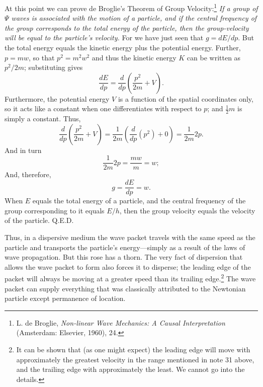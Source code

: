 At this point we can prove de Broglie's Theorem of Group
Velocity:\footnote{L. de Broglie, \emph{Non-linear Wave Mechanics: A
  Causal Interpretation} (Amsterdam: Elsevier, 1960), 24.}
\emph{If a group of $\Psi$ waves is associated with the motion of a particle,
and if the central frequency of the group corresponds to the total
energy of the particle, then the group-velocity will be equal to the
particle's velocity.} For we have just seen that $g = dE/dp$. But the total 
energy equals the kinetic energy plus the
potential energy. Further, $p = mw$, so that
$p^2 = m^2w^2$ and thus the kinetic
energy $K$ can be written as $p^2/2m$;
substituting gives
\begin{equation*}
\frac{dE}{dp} = \frac{d}{dp}\left(\frac{p^2}{2m} + V\right).
\end{equation*}
Furthermore, the potential energy $V$ is a function of the spatial
coordinates only, so it acts like a constant when one differentiates
with respect to $p$; and $\frac{1}{2}m$ is simply a constant. Thus,
\begin{equation*}
\frac{d}{dp}\left(\frac{p^2}{2m}+V\right) = \frac{1}{2m}\left(\frac{d}{dp}(p^2)+0\right) = \frac{1}{2m}2p.
\end{equation*}
And in turn
\begin{equation*}
\frac{1}{2m}2p = \frac{mw}{m} = w ;
\end{equation*}
And, therefore,
\begin{equation*}
g = \frac{dE}{dp} = w.
\end{equation*}
When $E$ equals the total energy of a particle, and the central
frequency of the group corresponding to it equals $E/h$, then the
group velocity equals the velocity of the particle. Q.E.D.

Thus, in a dispersive medium the wave packet travels with the same speed
as the particle and transports the particle's energy---simply as a
result of the laws of wave propagation. But this rose has a thorn. The
very fact of dispersion that allows the wave packet to form also forces
it to disperse; the leading edge of the packet will always be moving at
a greater speed than its trailing edge.\footnote{It can be shown that
  (as one might expect) the leading edge will move with approximately
  the greatest velocity in the range mentioned in note 31 above, and the
  trailing edge with approximately the least. We cannot go into the
  details.} The wave packet can supply everything that was classically
attributed to the Newtonian particle except permanence of location.

